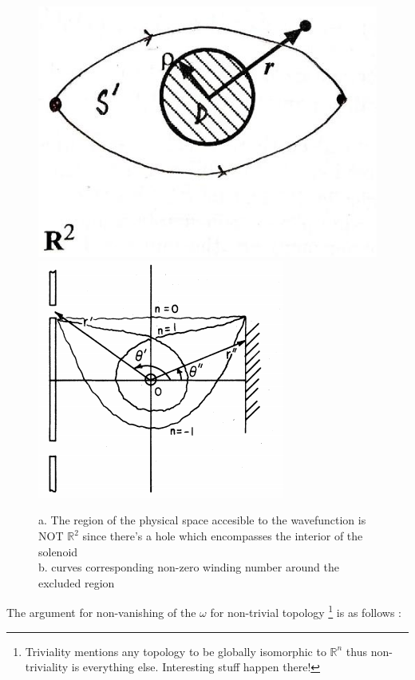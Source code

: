 \documentclass[8pt, twocoloumn]{article}
\begin{document}
\begin{figure}[h!]{\label{hola}}
\begin{center}
\includegraphics[scale = 0.25]{top.jpg}
\hspace{.2 in}
\includegraphics[scale = 0.4]{winding.png}
\caption{ a. The region of the physical space accesible to the wavefunction is NOT $\mathbb{R}^2$ since there's a hole which encompasses the interior of the solenoid \\
b. curves corresponding non-zero winding number around the excluded region}
\end{center}
\end{figure}

The argument for non-vanishing of the $\omega$ for non-trivial topology \footnote{Triviality mentions any topology to be globally isomorphic to $\mathbb{R}^n$ thus non-triviality is everything else. Interesting stuff happen there!} is as follows \cite{geop}:
\end{document}
